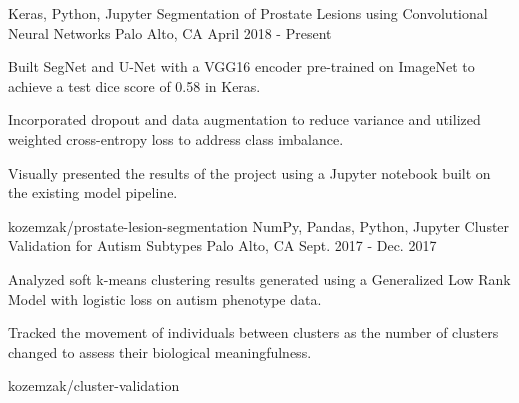 
\begin{cventries}
  \cvprojectentry
    {Keras, Python, Jupyter}
    {Segmentation of Prostate Lesions using Convolutional Neural Networks}
    {Palo Alto, CA}
    {April 2018 - Present}
    {
      \begin{cvitems}
        \item {Built SegNet and U-Net with a VGG16 encoder pre-trained on ImageNet to achieve a test dice score of 0.58 in Keras.}
        \item {Incorporated dropout and data augmentation to reduce variance and utilized weighted cross-entropy loss to address class imbalance.}
        \item {Visually presented the results of the project using a Jupyter notebook built on the existing model pipeline.}
      \end{cvitems} 
    }
    {kozemzak/prostate-lesion-segmentation}
  \cvprojectentry
    {NumPy, Pandas, Python, Jupyter}
    {Cluster Validation for Autism Subtypes}
    {Palo Alto, CA}
    {Sept. 2017 - Dec. 2017}
    {
      \begin{cvitems}
        \item {Analyzed soft k-means clustering results generated using a Generalized Low Rank Model with logistic loss on autism phenotype data.}
        \item {Tracked the movement of individuals between clusters as the number of clusters changed to assess their biological meaningfulness.}
      \end{cvitems}
    }
    {kozemzak/cluster-validation}
\end{cventries}
